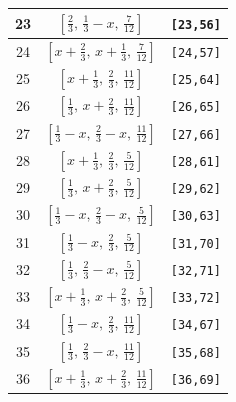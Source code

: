 \documentclass[fleqn,8pt]{jsarticle}
\begin{document}
\begin{longtable}{ccc}
23 & $\left[ \frac{2}{3},\, \frac{1}{3} - x,\, \frac{7}{12} \right]$ & {\tt [23,56]} \\ \hline
24 & $\left[ x + \frac{2}{3},\, x + \frac{1}{3},\, \frac{7}{12} \right]$ & {\tt [24,57]} \\ \hline
25 & $\left[ x + \frac{1}{3},\, \frac{2}{3},\, \frac{11}{12} \right]$ & {\tt [25,64]} \\ \hline
26 & $\left[ \frac{1}{3},\, x + \frac{2}{3},\, \frac{11}{12} \right]$ & {\tt [26,65]} \\ \hline
27 & $\left[ \frac{1}{3} - x,\, \frac{2}{3} - x,\, \frac{11}{12} \right]$ & {\tt [27,66]} \\ \hline
28 & $\left[ x + \frac{1}{3},\, \frac{2}{3},\, \frac{5}{12} \right]$ & {\tt [28,61]} \\ \hline
29 & $\left[ \frac{1}{3},\, x + \frac{2}{3},\, \frac{5}{12} \right]$ & {\tt [29,62]} \\ \hline
30 & $\left[ \frac{1}{3} - x,\, \frac{2}{3} - x,\, \frac{5}{12} \right]$ & {\tt [30,63]} \\ \hline
31 & $\left[ \frac{1}{3} - x,\, \frac{2}{3},\, \frac{5}{12} \right]$ & {\tt [31,70]} \\ \hline
32 & $\left[ \frac{1}{3},\, \frac{2}{3} - x,\, \frac{5}{12} \right]$ & {\tt [32,71]} \\ \hline
33 & $\left[ x + \frac{1}{3},\, x + \frac{2}{3},\, \frac{5}{12} \right]$ & {\tt [33,72]} \\ \hline
34 & $\left[ \frac{1}{3} - x,\, \frac{2}{3},\, \frac{11}{12} \right]$ & {\tt [34,67]} \\ \hline
35 & $\left[ \frac{1}{3},\, \frac{2}{3} - x,\, \frac{11}{12} \right]$ & {\tt [35,68]} \\ \hline
36 & $\left[ x + \frac{1}{3},\, x + \frac{2}{3},\, \frac{11}{12} \right]$ & {\tt [36,69]} \\
\end{longtable}
\renewcommand{\arraystretch}{1.2}
\end{document}
